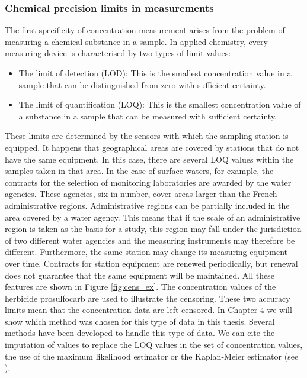 \subsubsection{Chemical precision limits in measurements}

The first specificity of concentration measurement arises from the problem of measuring a chemical substance in a sample. In applied chemistry, every measuring device is characterised by two types of limit values: 
\begin{itemize}
    \item The limit of detection (LOD): This is the smallest concentration value in a sample that can be distinguished from zero with sufficient certainty.
    \item The limit of quantification (LOQ): This is the smallest concentration value of a substance in a sample that can be measured with  sufficient certainty. 
\end{itemize}
These limits are determined by the sensors with which the sampling station is equipped. It happens that geographical areas are covered by stations that do not have the same equipment. In this case, there are several LOQ values within the samples taken in that area. In the case of surface waters, for example, the contracts for the selection of monitoring laboratories are awarded by the water agencies. These agencies, six in number, cover areas larger than the French administrative regions. Administrative regions can be partially included in the area covered by a water agency. This means that if the scale of an administrative region is taken as the basis for a study, this region may fall under the jurisdiction of two different water agencies and the measuring instruments may therefore be different. Furthermore, the same station may change its measuring equipment over time. Contracts for station equipment are renewed periodically, but renewal does not guarantee that the same equipment will be maintained. All these features are shown in Figure \ref{fig:cens_ex}. The concentration values of the herbicide prosulfocarb are used to illustrate the censoring. These two accuracy limits mean that the concentration data are left-censored. In Chapter 4 we will show which method was chosen for this type of data in this thesis. Several methods have been developed to handle this type of data. We can cite the imputation of values to replace the LOQ values in the set of concentration values, the use of the maximum likelihood estimator or the Kaplan-Meier estimator (see \cite{Gillaizeau2020,Croghan2003MethodsOD}).

